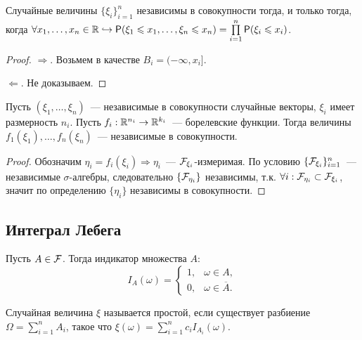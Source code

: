 \begin{theorem}
	Случайные величины $\{\xi_i\}_{i = 1}^n$ независимы в совокупности тогда, и только тогда, когда $\forall x_1, \ldots, x_n \in \mathbb{R} \hookrightarrow \mathsf{P}(\xi_1 \leqslant x_1, \ldots, \xi_n \leqslant x_n) = \prod\limits_{i = 1}^n\mathsf{P}(\xi_i \leqslant x_i)$.
	\begin{proof}
		$\Rightarrow$. Возьмем в качестве $B_i = (-\infty, x_i]$.
		
		$\Leftarrow$. Не доказываем.
	\end{proof}
\end{theorem}

\begin{theorem}
	Пусть $(\xi_1, \ldots, \xi_n)$~--- независимые в совокупности случайные векторы, $\xi_i$ имеет размерность $n_i$. Пусть $f_i: \mathbb{R}^{n_i} \rightarrow \mathbb{R}^{k_i}$~--- борелевские функции. Тогда величины $f_1(\xi_1), \ldots, f_n(\xi_n)$~--- независимые в совокупности.
	\begin{proof}
		Обозначим $\eta_i = f_i(\xi_i) \Rightarrow \eta_i$~--- $\mathcal{F}_{\xi_i}$-измеримая. По условию $\{\mathcal{F}_{\xi_i}\}_{i = 1}^n$~--- независимые $\sigma$-алгебры, следовательно $\{\mathcal{F}_{\eta_i}\}$ независимы, т.к. $\forall i : \mathcal{F}_{\eta_i} \subset \mathcal{F}_{\xi_i}$, значит по определению $\{\eta_i\}$ независимы в совокупности.
	\end{proof}
\end{theorem}

\subsection{Интеграл Лебега}
\begin{definition}
    Пусть $A \in \mathcal{F}$. Тогда индикатор множества $A$:
    \begin{equation*}
        I_A(\omega) = 
         \begin{cases}
           1,    &   \omega \in A,   \\
           0,    &   \omega \in \overline{A}.
         \end{cases}
        \end{equation*}
\end{definition}

\begin{definition}
    Случайная величина $\xi$ называется простой, если существует разбиение $\Omega = \sum\limits_{i=1}^nA_i$, такое что $ \xi(\omega) = \sum\limits_{i=1}^n c_iI_{A_i}(\omega)$.
\end{definition}

